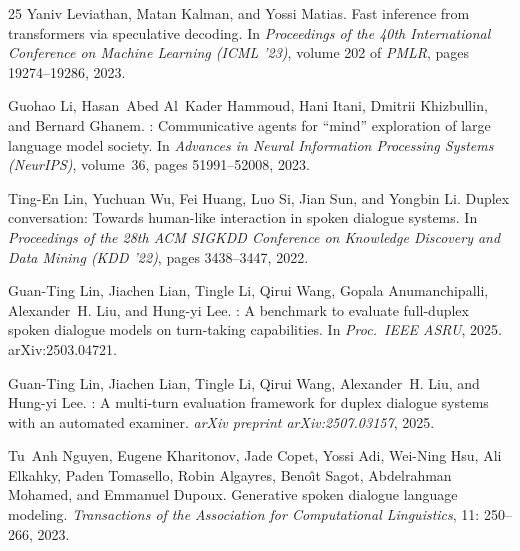 \documentclass{article}
\begin{document}
\begin{thebibliography}{25}
Yaniv Leviathan, Matan Kalman, and Yossi Matias.
\newblock Fast inference from transformers via speculative decoding.
\newblock In \emph{Proceedings of the 40th International Conference on Machine Learning (ICML '23)}, volume 202 of \emph{PMLR}, pages 19274--19286, 2023.

Guohao Li, Hasan~Abed Al~Kader Hammoud, Hani Itani, Dmitrii Khizbullin, and Bernard Ghanem.
: Communicative agents for ``mind'' exploration of large language model society.
\newblock In \emph{Advances in Neural Information Processing Systems (NeurIPS)}, volume~36, pages 51991--52008, 2023.

Ting-En Lin, Yuchuan Wu, Fei Huang, Luo Si, Jian Sun, and Yongbin Li.
\newblock Duplex conversation: Towards human-like interaction in spoken dialogue systems.
\newblock In \emph{Proceedings of the 28th ACM SIGKDD Conference on Knowledge Discovery and Data Mining (KDD '22)}, pages 3438--3447, 2022.

Guan-Ting Lin, Jiachen Lian, Tingle Li, Qirui Wang, Gopala Anumanchipalli, Alexander~H. Liu, and Hung-yi Lee.
: A benchmark to evaluate full-duplex spoken dialogue models on turn-taking capabilities.
\newblock In \emph{Proc.\ IEEE ASRU}, 2025{}. arXiv:2503.04721.

Guan-Ting Lin, Jiachen Lian, Tingle Li, Qirui Wang, Alexander~H. Liu, and Hung-yi Lee.
: A multi-turn evaluation framework for duplex dialogue systems with an automated examiner.
\newblock \emph{arXiv preprint arXiv:2507.03157}, 2025{}.

Tu~Anh Nguyen, Eugene Kharitonov, Jade Copet, Yossi Adi, Wei-Ning Hsu, Ali Elkahky, Paden Tomasello, Robin Algayres, Beno{\^\i}t Sagot, Abdelrahman Mohamed, and Emmanuel Dupoux.
\newblock Generative spoken dialogue language modeling.
\newblock \emph{Transactions of the Association for Computational Linguistics}, 11: 250--266, 2023.


\end{thebibliography}
\end{document}
